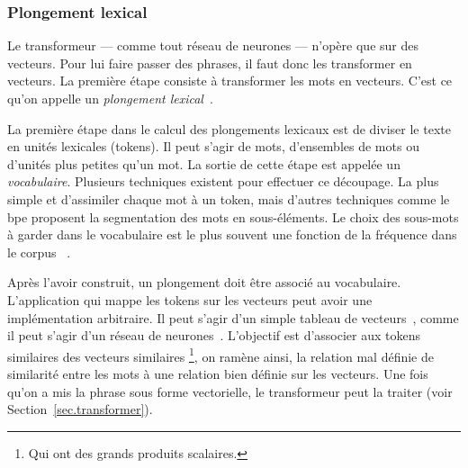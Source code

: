 \subsubsection{Plongement lexical}

Le transformeur --- comme tout réseau de neurones --- n'opère que sur des vecteurs.
Pour lui faire passer des phrases, il faut donc les transformer en vecteurs.
La première étape consiste à transformer les mots en vecteurs.
C'est ce qu'on appelle un \emph{plongement lexical}~\cite{Almeida_Xexéo_2019}.

La première étape dans le calcul des plongements lexicaux est de diviser le texte en unités lexicales (tokens).
Il peut s'agir de mots, d'ensembles de mots ou d'unités plus petites qu'un mot.
La sortie de cette étape est appelée un \emph{vocabulaire}.
Plusieurs techniques existent pour effectuer ce découpage. 
La plus simple et d'assimiler chaque mot à un token,
mais d'autres techniques comme le \gls{bpe} proposent la segmentation des mots en sous-éléments.
Le choix des sous-mots à garder dans le vocabulaire est le plus souvent une fonction de la fréquence dans le corpus%
~\cite{Rai_Borah_2021}.


Après l'avoir construit, un plongement doit être associé au vocabulaire.
L'application qui mappe les tokens sur les vecteurs peut avoir une implémentation arbitraire.
Il peut s'agir d'un simple tableau de vecteurs~\cite{Paszke_et_al_2019},
comme il peut s'agir d'un réseau de neurones~\cite{Church_2017}.
L'objectif est d'associer aux tokens similaires des vecteurs similaires%
\footnote{Qui ont des grands produits scalaires.}, %
on ramène ainsi, la relation mal définie de similarité entre les mots à une relation bien définie sur les vecteurs.
Une fois qu'on a mis la phrase sous forme vectorielle,
le transformeur peut la traiter (voir Section~\ref{sec.transformer}).